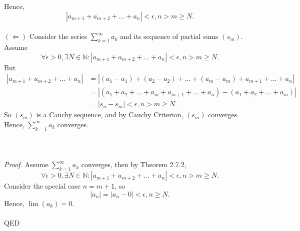 \documentclass{article}
\begin{document}
            Hence,
            \begin{equation*}
                |a_{m+1}+a_{m+2}+\dots+a_n| < \epsilon, n > m \geq N.
            \end{equation*}\\
            $(\Leftarrow)$ Consider the series $\sum_{k=1}^\infty a_k$ and its sequence of partial sums $(s_m)$. Assume 
            \begin{equation*}
                \forall \epsilon > 0, \exists N \in \mathbb{N}: |a_{m+1}+a_{m+2}+\dots+a_n|<\epsilon,n > m \geq N.
            \end{equation*}
            But
            \begin{align*}
                |a_{m+1}+a_{m+2}+\dots+a_n| & = |(a_1-a_1)+(a_2-a_2)+\dots+(a_m-a_m)+a_{m+1}+\dots+a_n| \\ 
                & = |(a_1+a_2+\dots+a_m+a_{m+1}+\dots+a_n)-(a_1+a_2+\dots+a_m)| \\
                & = |s_n - s_m| < \epsilon, n > m \geq N.
            \end{align*}
            So $(s_m)$ is a Cauchy sequence, and by Cauchy Criterion, $(s_m)$ converges. Hence, $\sum_{k=1}^\infty a_k$ converges.
            \\ \\
            \\ \\
            \textit{Proof.} Assume $\sum_{k=1}^\infty a_k$ converges, then by Theorem 2.7.2, 
            \begin{equation*}
                \forall \epsilon > 0, \exists N \in \mathbb{N}: |a_{m+1}+a_{m+2}+\dots+a_n|<\epsilon,n > m \geq N.
            \end{equation*}
            Consider the special case $n=m+1$, so
            \begin{equation*}
                |a_n|=|a_n-0|<\epsilon,n \geq N.
            \end{equation*}
            Hence, $\lim(a_k)=0$.
            \\ \\
            QED
            \\ \\
\end{document}
